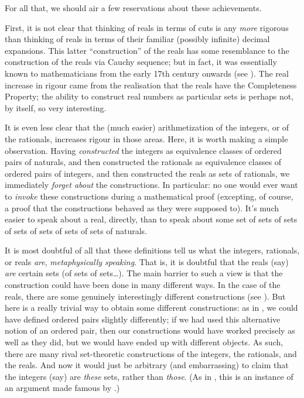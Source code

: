 For all that, we should air a few reservations about these achievements. 

First, it is not clear that thinking of reals in terms of cuts is any
\emph{more} rigorous than thinking of reals in terms of their familiar
(possibly infinite) decimal expansions. This latter ``construction''
of the reals has some resemblance to the construction of the reals via
Cauchy sequence; but in fact, it was essentially known to
mathematicians from the early 17th century onwards (see
). The real increase in rigour came from the
realisation that the reals have the Completeness Property; the ability
to construct real numbers as particular sets is perhaps not, by
itself, so very interesting.

It is even less clear that the (much easier) arithmetization of the
integers, or of the rationals, increases rigour in those areas. Here,
it is worth making a simple observation. Having \emph{constructed} the
integers as equivalence classes of ordered pairs of naturals, and then
constructed the rationals as equivalence classes of ordered pairs of
integers, and then constructed the reals as sets of rationals, we
immediately \emph{forget about} the constructions. In particular: no
one would ever want to \emph{invoke} these constructions during a
mathematical proof (excepting, of course, a proof that the
constructions behaved as they were supposed to). It's much easier to
speak about a real, directly, than to speak about some set of sets of
sets of sets of sets of sets of sets of naturals. 













	
It is most doubtful of all that these definitions tell us what the
integers, rationals, or reals \emph{are}, \emph{metaphysically
speaking}. That is, it is doubtful that the reals (say) \emph{are}
certain sets (of sets of sets\ldots). The main barrier to such a view
is that the construction could have been done in many different ways.
In the case of the reals, there are some genuinely interestingly
different constructions (see ). But here is a
really trivial way to obtain some different constructions: as in
, we could have defined ordered pairs
slightly differently; if we had used this alternative notion of an
ordered pair, then our constructions would have worked precisely as
well as they did, but we would have ended up with different objects.
As such, there are many rival set-theoretic constructions of the
integers, the rationals, and the reals. And now it would just be
arbitrary (and embarrassing) to claim that the integers (say) are
\emph{these} sets, rather than \emph{those}. (As in
, this is an instance of an argument made
famous by \citealt{Benacerraf1965}.)

